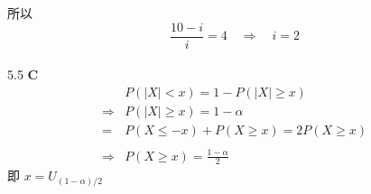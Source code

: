 \documentclass[a4paper]{ctexart}    %
\begin{document}
	所以
	\begin{equation*}
		\frac{10-i}{i} = 4 \quad \Rightarrow \quad i = 2
	\end{equation*}
	\\
	5.5 \quad \textbf{C} \\
	\begin{equation*}
		\begin{split}
			& P(|X|<x) = 1-P(|X|\geq x) \\
			\Rightarrow & P(|X|\geq x) = 1-\alpha \\
			=& P(X \leq -x) + P(X \geq x) = 2P(X \geq x) 
			\\
			\\
			\Rightarrow & P(X \geq x) = \frac{1-\alpha}{2}
		\end{split}
	\end{equation*}
	即 $ x = U_{(1-\alpha) / 2} $ \\
	\newpage
\end{document}
